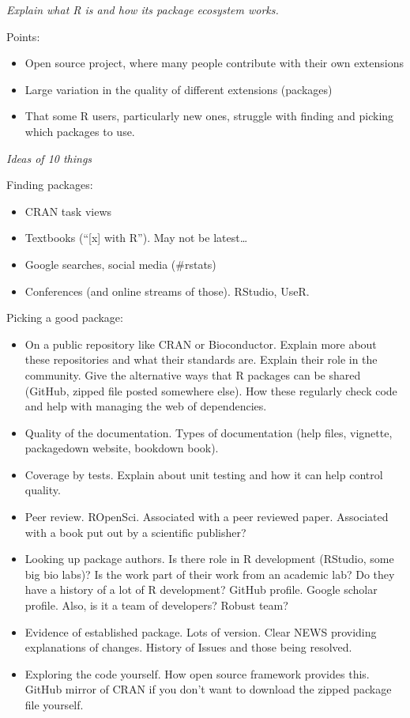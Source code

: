 \documentclass[10pt,letterpaper]{article}
\providecommand{\tightlist}{%
  \setlength{\itemsep}{0pt}\setlength{\parskip}{0pt}}
\begin{document}
\emph{Explain what R is and how its package ecosystem works.}

Points:

\begin{itemize}
\tightlist
\item
  Open source project, where many people contribute with their own
  extensions
\item
  Large variation in the quality of different extensions (packages)
\item
  That some R users, particularly new ones, struggle with finding and
  picking which packages to use.
\end{itemize}

\emph{Ideas of 10 things}

Finding packages:

\begin{itemize}
\tightlist
\item
  CRAN task views
\item
  Textbooks (``{[}x{]} with R''). May not be latest\ldots{}
\item
  Google searches, social media (\#rstats)
\item
  Conferences (and online streams of those). RStudio, UseR.
\end{itemize}

Picking a good package:

\begin{itemize}
\tightlist
\item
  On a public repository like CRAN or Bioconductor. Explain more about
  these repositories and what their standards are. Explain their role in
  the community. Give the alternative ways that R packages can be shared
  (GitHub, zipped file posted somewhere else). How these regularly check
  code and help with managing the web of dependencies.
\item
  Quality of the documentation. Types of documentation (help files,
  vignette, packagedown website, bookdown book).
\item
  Coverage by tests. Explain about unit testing and how it can help
  control quality.
\item
  Peer review. ROpenSci. Associated with a peer reviewed paper.
  Associated with a book put out by a scientific publisher?
\item
  Looking up package authors. Is there role in R development (RStudio,
  some big bio labs)? Is the work part of their work from an academic
  lab? Do they have a history of a lot of R development? GitHub profile.
  Google scholar profile. Also, is it a team of developers? Robust team?
\item
  Evidence of established package. Lots of version. Clear NEWS providing
  explanations of changes. History of Issues and those being resolved.
\item
  Exploring the code yourself. How open source framework provides this.
  GitHub mirror of CRAN if you don't want to download the zipped package
  file yourself.
\end{itemize}
\end{document}
